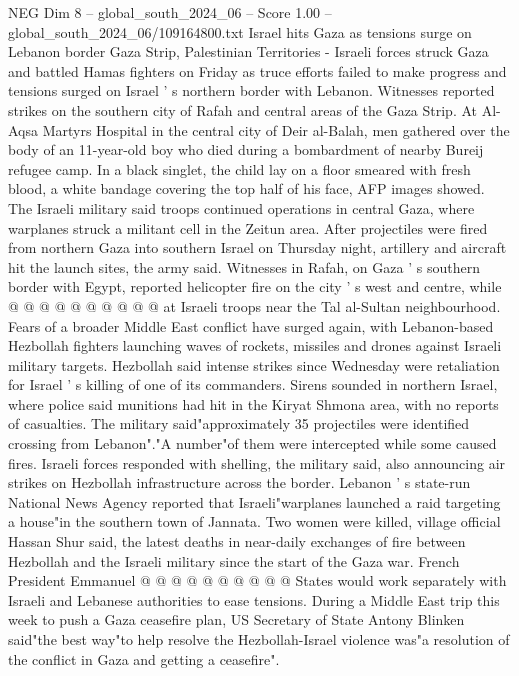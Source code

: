 \begin{textsample}{NEG Dim 8 – global\_south\_2024\_06 – Score 1.00 – global\_south\_2024\_06/109164800.txt}  \label{ex:f8_neg_246}
Israel hits Gaza as tensions surge on Lebanon border Gaza Strip, Palestinian Territories - Israeli forces struck Gaza and battled Hamas fighters on Friday as truce efforts failed to make progress and tensions surged on Israel ' s northern border with Lebanon.
Witnesses reported strikes on the southern city of Rafah and central areas of the Gaza Strip.
At Al-Aqsa Martyrs Hospital in the central city of Deir al-Balah, men gathered over the body of an 11-year-old boy who died during a bombardment of nearby Bureij refugee camp.
In a black singlet, the child lay on a floor smeared with fresh blood, a white bandage covering the top half of his face, AFP images showed.
The Israeli military said troops continued operations in central Gaza, where warplanes struck a militant cell in the Zeitun area.
After projectiles were fired from northern Gaza into southern Israel on Thursday night, artillery and aircraft hit the launch sites, the army said.
Witnesses in Rafah, on Gaza ' s southern border with Egypt, reported helicopter fire on the city ' s west and centre, while @ @ @ @ @ @ @ @ @ @ at Israeli troops near the Tal al-Sultan neighbourhood.
Fears of a broader Middle East conflict have surged again, with Lebanon-based Hezbollah fighters launching waves of rockets, missiles and drones against Israeli military targets.
Hezbollah said intense strikes since Wednesday were retaliation for Israel ' s killing of one of its commanders.
Sirens sounded in northern Israel, where police said munitions had hit in the Kiryat Shmona area, with no reports of casualties.
The military said"approximately 35 projectiles were identified crossing from Lebanon"."A number"of them were intercepted while some caused fires.
Israeli forces responded with shelling, the military said, also announcing air strikes on Hezbollah infrastructure across the border.
Lebanon ' s state-run National News Agency reported that Israeli"warplanes launched a raid targeting a house"in the southern town of Jannata.
Two women were killed, village official Hassan Shur said, the latest deaths in near-daily exchanges of fire between Hezbollah and the Israeli military since the start of the Gaza war.
French President Emmanuel @ @ @ @ @ @ @ @ @ @ States would work separately with Israeli and Lebanese authorities to ease tensions.
During a Middle East trip this week to push a Gaza ceasefire plan, US Secretary of State Antony Blinken said"the best way"to help resolve the Hezbollah-Israel violence was"a resolution of the conflict in Gaza and getting a ceasefire".

\end{textsample}

